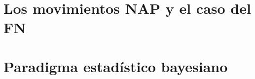 \documentclass[oneside,10pt,review,usenames,dvipsnames]{book}
\theoremstyle{definition}
\begin{document}

\frontmatter











\tableofcontents




\mainmatter 

\pagestyle{fancy}
	\fancyhf{}
	\rhead{\thepage}
	\fancyhead[L]{\nouppercase{\leftmark}}

\part{Los movimientos NAP y el caso del FN} 
	
	
	
	

\part{Paradigma estadístico bayesiano}

	
	

	


\appendix
\end{document}

